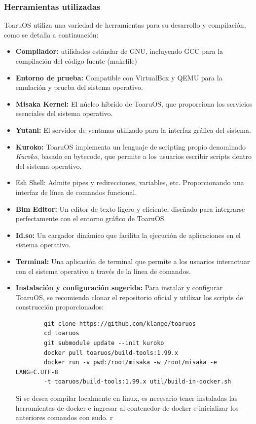 \subsubsection{Herramientas utilizadas}
ToaruOS utiliza una variedad de herramientas para su desarrollo y compilación, como se detalla a continuación:
\begin{itemize}
	\item \textbf{Compilador:} utilidades estándar de GNU, incluyendo GCC para la compilación del código fuente (makefile)
	\item \textbf{Entorno de prueba:} Compatible con VirtualBox y QEMU para la emulación y prueba del sistema operativo.
	\item \textbf{Misaka Kernel:} El núcleo híbrido de ToaruOS, que proporciona los servicios esenciales del sistema operativo.
	\item \textbf{Yutani:} El servidor de ventanas utilizado para la interfaz gráfica del sistema.
	\item \textbf{Kuroko:}  ToaruOS implementa un lenguaje de scripting propio denominado \textit{Kuroko}, basado en bytecode, que permite a los usuarios escribir scripts dentro del sistema operativo.
	\item Esh Shell: Admite pipes y redirecciones, variables, etc. Proporcionando una interfaz de línea de comandos funcional.
	\item \textbf{Bim Editor:} Un editor de texto ligero y eficiente, diseñado para integrarse perfectamente con el entorno gráfico de ToaruOS.
	\item \textbf{Id.so: } Un cargador dinámico que facilita la ejecución de aplicaciones en el sistema operativo.
	\item \textbf{Terminal:} Una aplicación de terminal que permite a los usuarios interactuar con el sistema operativo a través de la línea de comandos.
	\item \textbf{Instalación y configuración sugerida:} Para instalar y configurar ToaruOS, se recomienda clonar el repositorio oficial y utilizar los scripts de construcción proporcionados:
	    \begin{verbatim}
		git clone https://github.com/klange/toaruos
		cd toaruos
		git submodule update --init kuroko
		docker pull toaruos/build-tools:1.99.x
		docker run -v pwd:/root/misaka -w /root/misaka -e LANG=C.UTF-8 
		-t toaruos/build-tools:1.99.x util/build-in-docker.sh
		\end{verbatim}

    Si se desea compilar localmente en linux, es necesario tener instaladas las herramientas de docker e ingresar al contenedor de docker e inicializar los anteriores comandos con sudo. r
\end{itemize}	

